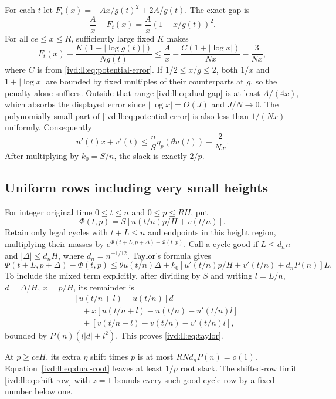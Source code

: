 \documentclass[11pt,letterpaper]{article}
\theoremstyle{remark}\newtheorem{remark}[theorem]{Remark}
\numberwithin{equation}{section}
\begin{document}
For each $t$ let $F_t(x)=-Ax/g(t)^2+2A/g(t)$. The exact gap is
\begin{equation}\label{ivd:ll:eq:dual-gap}
 \frac A x-F_t(x)=\frac A x(1-x/g(t))^2.
\end{equation}
For all $ce\le x\le R$, sufficiently large fixed $K$ makes
\begin{equation}\label{ivd:ll:eq:dual-penalty}
 F_t(x)-\frac{K(1+|\log g(t)|)}{N g(t)}
 \le\frac A x-\frac{C(1+|\log x|)}{Nx}-\frac3{Nx},
\end{equation}
where $C$ is from \eqref{ivd:ll:eq:potential-error}. If
$1/2\le x/g\le2$, both $1/x$ and $1+|\log x|$ are bounded
by fixed multiples of their counterparts at $g$, so the penalty
alone suffices. Outside that range \eqref{ivd:ll:eq:dual-gap} is at
least $A/(4x)$, which absorbs the displayed error since
$|\log x|=O(J)$ and $J/N\to0$. The polynomially small part of
\eqref{ivd:ll:eq:potential-error} is also less than $1/(Nx)$ uniformly.
Consequently
\begin{equation}\label{ivd:ll:eq:dual-root}
 u'(t)x+v'(t)\le\frac nS\eta_p(\theta u(t))-\frac2{Nx}.
\end{equation}
After multiplying by $k_0=S/n$, the slack is exactly $2/p$.

\subsection{Uniform rows including very small heights}
For integer original time $0\le t\le n$ and $0\le p\le RH$, put
\[
 \Phi(t,p)=S[u(t/n)p/H+v(t/n)].
\]
Retain only legal cycles with $t+L\le n$ and endpoints in this
height region, multiplying their masses by
$e^{\Phi(t+L,p+\Delta)-\Phi(t,p)}$. Call a cycle good if
$L\le d_n n$ and $|\Delta|\le d_n H$, where $d_n=n^{-1/12}$.
Taylor's formula gives
\begin{equation}\label{ivd:ll:eq:taylor}
 \Phi(t+L,p+\Delta)-\Phi(t,p)
 \le\theta u(t/n)\Delta+
 k_0[u'(t/n)p/H+v'(t/n)+d_nP(n)]L.
\end{equation}
To include the mixed term explicitly, after dividing by $S$ and
writing $l=L/n$, $d=\Delta/H$, $x=p/H$, its remainder is
\begin{align*}
 &[u(t/n+l)-u(t/n)]d\\
 &\quad+x[u(t/n+l)-u(t/n)-u'(t/n)l]\\
 &\quad+[v(t/n+l)-v(t/n)-v'(t/n)l],
\end{align*}
bounded by $P(n)(l|d|+l^2)$. This proves \eqref{ivd:ll:eq:taylor}.

At $p\ge ceH$, its extra $\eta$ shift times $p$ is at most
$RN d_nP(n)=o(1)$. Equation~\eqref{ivd:ll:eq:dual-root} leaves at least
$1/p$ root slack. The shifted-row limit \eqref{ivd:ll:eq:shift-row} with
$z=1$ bounds every such good-cycle row by a fixed number below one.
\end{document}
